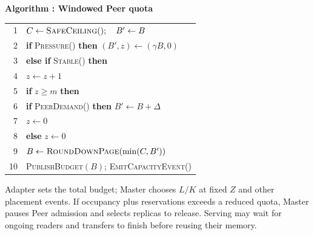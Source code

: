 \par\medskip\noindent\begin{minipage}{\columnwidth}
\raggedright
 \label{alg:adapter}
 \textbf{Algorithm \thedesignalgorithm: Windowed Peer quota}
 \par\smallskip
 \begin{tabularx}{\columnwidth}{@{}r@{\quad}X@{}}
 \toprule
 1 & $C\gets\textsc{SafeCeiling}();\quad B'\gets B$ \\
 2 & \textbf{if} \textsc{Pressure}() \textbf{then} $(B',z)\gets(\gamma B,0)$ \\
 3 & \textbf{else if} \textsc{Stable}() \textbf{then} \\
 4 & \quad $z\gets z+1$ \\
 5 & \quad \textbf{if} $z\ge m$ \textbf{then} \\
 6 & \qquad \textbf{if} \textsc{PeerDemand}() \textbf{then} $B'\gets B+\Delta$ \\
 7 & \qquad $z\gets0$ \\
 8 & \textbf{else} $z\gets0$ \\
 9 & $B\gets\textsc{RoundDownPage}(\min(C,B'))$ \\
 10 & \textsc{PublishBudget}$(B)$; \textsc{EmitCapacityEvent}() \\
 \bottomrule
 \end{tabularx}
\end{minipage}\par\medskip

Adapter sets the total budget; Master chooses $L/K$ at fixed $Z$ and
other placement events. If occupancy plus reservations exceeds a reduced
quota, Master pauses Peer admission and selects replicas to release.
Serving may wait for ongoing readers and transfers to finish before
reusing their memory.
